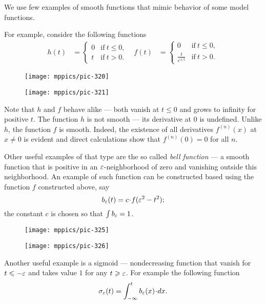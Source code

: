 We use few examples of smooth functions that mimic behavior of some model functions.

For example, consider the following functions
\begin{align*}
h(t)&=
\begin{cases}
0&\text{if}\ t\le 0,
\\
t&\text{if}\ t> 0.
\end{cases}
&
f(t)&=
\begin{cases}
0&\text{if}\ t\le 0,
\\
\frac{t}{e^{1\!/\!t}}&\text{if}\ t> 0.
\end{cases}
\end{align*}
\begin{figure}[h]
\begin{minipage}{.48\textwidth}
\centering
\texttt{[image: mppics/pic-320]}
\end{minipage}\hfill
\begin{minipage}{.48\textwidth}
\centering
\texttt{[image: mppics/pic-321]}
\end{minipage}
\end{figure}
Note that $h$ and $f$ behave alike ---
both vanish at $t\le 0$ and grows to infinity for positive $t$.
The function $h$ is not smooth --- its derivative at $0$ is undefined.
Unlike $h$, the function $f$ is smooth.
Indeed, the existence of all derivatives $f^{(n)}(x)$ at $x\ne 0$ is evident and direct calculations show that $f^{(n)}(0)=0$ for all $n$.

Other useful examples of that type are the so called \emph{bell function} --- a smooth function that is positive in an $\varepsilon$-neighborhood of zero and vanishing outside this neighborhood.
An example of such function can be constructed based using the function $f$ constructed above, say 
\[b_\eps(t)=c\cdot f(\eps^2-t^2);\]
the constant $c$ is chosen so that $\int b_\varepsilon=1$.

\begin{figure}[h!]
\begin{minipage}{.48\textwidth}
\centering
\texttt{[image: mppics/pic-325]}
\end{minipage}\hfill
\begin{minipage}{.48\textwidth}
\centering
\texttt{[image: mppics/pic-326]}
\end{minipage}
\end{figure}

Another useful example is a sigmoid --- nondecreasing function that vanish for $t\leqslant -\varepsilon$ and takes value $1$ for any $t\geqslant \varepsilon$.
For example the following function \label{page:sigma-function}
\[\sigma_\eps(t)
=
\int_{-\infty}^t b_\eps(x)\cdot dx.\]


